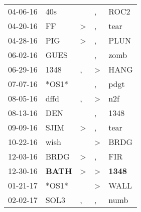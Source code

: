 \begin{supertabular}{p{0.07\textwidth}p{0.06\textwidth}p{0.02\textwidth}p{0.02\textwidth}p{0.06\textwidth}}
          04-06-16\textsuperscript{} &            40s\textsuperscript{} &                  &                , &           ROC2\textsuperscript{} \\
          04-20-16\textsuperscript{} &             FF\textsuperscript{} &     \textgreater &                , &           tear\textsuperscript{} \\
          04-28-16\textsuperscript{} &            PIG\textsuperscript{} &     \textgreater &                , &           PLUN\textsuperscript{} \\
          06-02-16\textsuperscript{} &           GUES\textsuperscript{} &                  &                , &           zomb\textsuperscript{} \\
          06-29-16\textsuperscript{} &           1348\textsuperscript{} &                , &     \textgreater &           HANG\textsuperscript{} \\
          07-07-16\textsuperscript{} &                            *OS1* &                  &                , &           pdgt\textsuperscript{} \\
          08-05-16\textsuperscript{} &           dffd\textsuperscript{} &                , &     \textgreater &            n2f\textsuperscript{} \\
          08-13-16\textsuperscript{} &            DEN\textsuperscript{} &                  &                , &           1348\textsuperscript{} \\
          09-09-16\textsuperscript{} &           SJIM\textsuperscript{} &     \textgreater &                , &           tear\textsuperscript{} \\
          10-22-16\textsuperscript{} &           wish\textsuperscript{} &                  &     \textgreater &           BRDG\textsuperscript{} \\
          12-03-16\textsuperscript{} &           BRDG\textsuperscript{} &     \textgreater &                , &            FIR\textsuperscript{} \\
          12-30-16\textsuperscript{} &  \textbf{BATH\textsuperscript{}} &     \textgreater &     \textgreater &  \textbf{1348\textsuperscript{}} \\
          01-21-17\textsuperscript{} &                            *OS1* &                  &     \textgreater &           WALL\textsuperscript{} \\
          02-02-17\textsuperscript{} &           SOL3\textsuperscript{} &                , &                , &           numb\textsuperscript{} \\

\end{supertabular}
